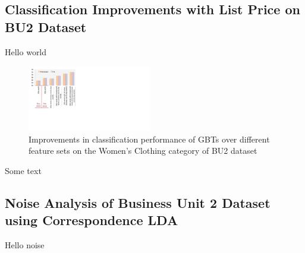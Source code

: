 \subsection{Classification Improvements with List Price on BU2 Dataset}
\label{Subsect:BU2-classification-improve-list-price}

Hello world
\begin{figure}
	\centering
	\includegraphics[width=0.48\textwidth]{images/BU2-gbt-feature-improvements}
	\caption{Improvements in classification performance of GBTs over different feature sets on the Women's Clothing category of BU2 dataset}
	\label{Figure_BU2-gbt-feature-improvements}
\end{figure}
Some text

\subsection{Noise Analysis of Business Unit 2 Dataset using Correspondence LDA}
\label{Subsect:BU2-noise-analysis}

Hello noise



